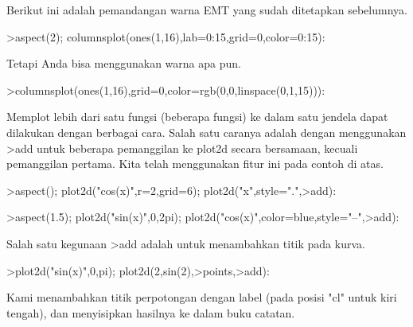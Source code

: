 \documentclass[12pt,Times new roman,letterpaper]{book}
\begin{document}
\begin{eulernootebook}
\begin{eulercomment}
\begin{eulercomment}
\begin{eulernootebook}
\begin{eulercomment}
\begin{eulercomment}
\begin{eulercomment}
\begin{eulercomment}
\begin{eulercomment}
\begin{eulercomment}
\begin{eulercomment}
\begin{eulernotebook}
\begin{eulercomment}
\begin{eulercomment}
\begin{eulercomment}
\begin{eulercomment}
\begin{eulercomment}
Berikut ini adalah pemandangan warna EMT yang sudah ditetapkan
sebelumnya.
\end{eulercomment}
\begin{eulerprompt}
>aspect(2); columnsplot(ones(1,16),lab=0:15,grid=0,color=0:15):
\end{eulerprompt}
\begin{eulercomment}
Tetapi Anda bisa menggunakan warna apa pun.
\end{eulercomment}
\begin{eulerprompt}
>columnsplot(ones(1,16),grid=0,color=rgb(0,0,linspace(0,1,15))):
\end{eulerprompt}
\begin{eulercomment}
Memplot lebih dari satu fungsi (beberapa fungsi) ke dalam satu jendela
dapat dilakukan dengan berbagai cara. Salah satu caranya adalah dengan
menggunakan \textgreater{}add untuk beberapa pemanggilan ke plot2d secara
bersamaan, kecuali pemanggilan pertama. Kita telah menggunakan fitur
ini pada contoh di atas.
\end{eulercomment}
\begin{eulerprompt}
>aspect(); plot2d("cos(x)",r=2,grid=6); plot2d("x",style=".",>add):
\end{eulerprompt}
\begin{eulerprompt}
>aspect(1.5); plot2d("sin(x)",0,2pi); plot2d("cos(x)",color=blue,style="--",>add):
\end{eulerprompt}
\begin{eulercomment}
Salah satu kegunaan \textgreater{}add adalah untuk menambahkan titik pada kurva.
\end{eulercomment}
\begin{eulerprompt}
>plot2d("sin(x)",0,pi); plot2d(2,sin(2),>points,>add):
\end{eulerprompt}
\begin{eulercomment}
Kami menambahkan titik perpotongan dengan label (pada posisi "cl"
untuk kiri tengah), dan menyisipkan hasilnya ke dalam buku catatan.

\end{eulercomment}
\end{eulercomment}
\end{eulercomment}
\end{eulercomment}
\end{eulercomment}
\end{eulernotebook}
\end{eulercomment}
\end{eulercomment}
\end{eulercomment}
\end{eulercomment}
\end{eulercomment}
\end{eulercomment}
\end{eulercomment}
\end{eulernootebook}
\end{eulercomment}
\end{eulercomment}
\end{eulernootebook}
\end{document}
